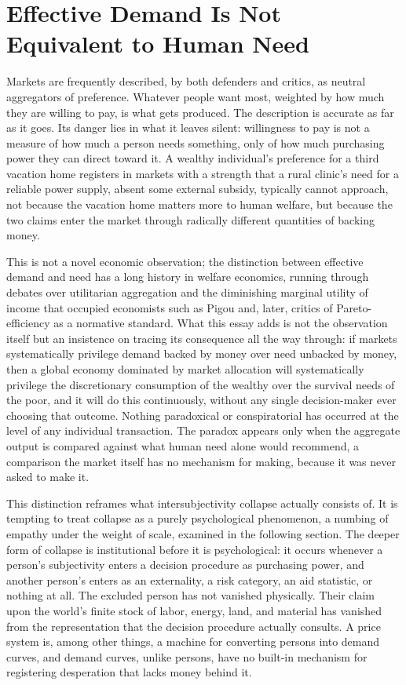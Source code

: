 \documentclass[11pt]{article}
\begin{document}
\section{Effective Demand Is Not Equivalent to Human Need}

Markets are frequently described, by both defenders and critics, as neutral aggregators of preference. Whatever people want most, weighted by how much they are willing to pay, is what gets produced. The description is accurate as far as it goes. Its danger lies in what it leaves silent: willingness to pay is not a measure of how much a person needs something, only of how much purchasing power they can direct toward it. A wealthy individual's preference for a third vacation home registers in markets with a strength that a rural clinic's need for a reliable power supply, absent some external subsidy, typically cannot approach, not because the vacation home matters more to human welfare, but because the two claims enter the market through radically different quantities of backing money.

This is not a novel economic observation; the distinction between effective demand and need has a long history in welfare economics, running through debates over utilitarian aggregation and the diminishing marginal utility of income that occupied economists such as Pigou and, later, critics of Pareto-efficiency as a normative standard. What this essay adds is not the observation itself but an insistence on tracing its consequence all the way through: if markets systematically privilege demand backed by money over need unbacked by money, then a global economy dominated by market allocation will systematically privilege the discretionary consumption of the wealthy over the survival needs of the poor, and it will do this continuously, without any single decision-maker ever choosing that outcome. Nothing paradoxical or conspiratorial has occurred at the level of any individual transaction. The paradox appears only when the aggregate output is compared against what human need alone would recommend, a comparison the market itself has no mechanism for making, because it was never asked to make it.

This distinction reframes what intersubjectivity collapse actually consists of. It is tempting to treat collapse as a purely psychological phenomenon, a numbing of empathy under the weight of scale, examined in the following section. The deeper form of collapse is institutional before it is psychological: it occurs whenever a person's subjectivity enters a decision procedure as purchasing power, and another person's enters as an externality, a risk category, an aid statistic, or nothing at all. The excluded person has not vanished physically. Their claim upon the world's finite stock of labor, energy, land, and material has vanished from the representation that the decision procedure actually consults. A price system is, among other things, a machine for converting persons into demand curves, and demand curves, unlike persons, have no built-in mechanism for registering desperation that lacks money behind it.
\end{document}
